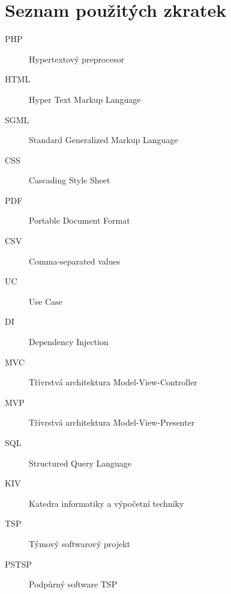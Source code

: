 \documentclass[czech,BP]{thesiskiv}
\begin{document}
\chapter*{Seznam použitých zkratek}
\begin{description}
	\item[PHP] Hypertextový preprocesor
	\item[HTML] Hyper Text Markup Language
	\item[SGML] Standard Generalized Markup Language
	\item[CSS] Cascading Style Sheet
	\item[PDF] Portable Document Format
	\item[CSV] Comma-separated values
	\item[UC] Use Case
	\item[DI] Dependency Injection
	\item[MVC] Třívrstvá architektura Model-View-Controller
	\item[MVP] Třívrstvá architektura Model-View-Presenter
	\item[SQL] Structured Query Language
	\item[KIV] Katedra informatiky a výpočetní techniky
	\item[TSP] Týmový softwarový projekt
	\item[PSTSP] Podpůrný software TSP
\end{description}
%

\end{document}
